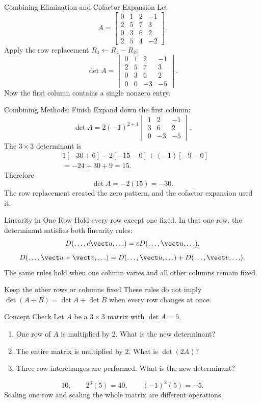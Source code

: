 \begin{frame}{Combining Elimination and Cofactor Expansion}
Let
\[
A=\begin{bmatrix}
0&1&2&-1\\
2&5&7&3\\
0&3&6&2\\
2&5&4&-2
\end{bmatrix}.
\]
Apply the row replacement $R_4\leftarrow R_4-R_2$:
\[
\det A=
\begin{vmatrix}
0&1&2&-1\\
2&5&7&3\\
0&3&6&2\\
0&0&-3&-5
\end{vmatrix}.
\]
\pause
Now the first column contains a single nonzero entry.
\end{frame}

\begin{frame}{Combining Methods: Finish}
Expand down the first column:
\[
\det A
=2(-1)^{2+1}
\begin{vmatrix}
1&2&-1\\
3&6&2\\
0&-3&-5
\end{vmatrix}.
\]
\pause
The $3\times3$ determinant is
\begin{align*}
&1[-30+6]-2[-15-0]+(-1)[-9-0]\\
&=-24+30+9=15.
\end{align*}
Therefore
\[
\boxed{\det A=-2(15)=-30}.
\]
The row replacement created the zero pattern, and the cofactor expansion used it.
\end{frame}

\begin{frame}{Linearity in One Row}
Hold every row except one fixed. In that one row, the determinant satisfies both linearity rules:
\[
D(\ldots,c\vect u,\ldots)=cD(\ldots,\vect u,\ldots),
\]
\[
D(\ldots,\vect u+\vect v,\ldots)
=D(\ldots,\vect u,\ldots)+D(\ldots,\vect v,\ldots).
\]
\pause
The same rules hold when one column varies and all other columns remain fixed.
\medskip

\begin{alertblock}{Keep the other rows or columns fixed}
These rules do not imply $\det(A+B)=\det A+\det B$ when every row changes at once.
\end{alertblock}
\end{frame}

\begin{frame}{Concept Check}
Let $A$ be a $3\times3$ matrix with $\det A=5$.
\begin{enumerate}
  \item One row of $A$ is multiplied by $2$. What is the new determinant?
  \item The entire matrix is multiplied by $2$. What is $\det(2A)$?
  \item Three row interchanges are performed. What is the new determinant?
\end{enumerate}
\pause
\[
\boxed{10},
\qquad
\boxed{2^3(5)=40},
\qquad
\boxed{(-1)^3(5)=-5}.
\]
\pause
Scaling one row and scaling the whole matrix are different operations.
\end{frame}
